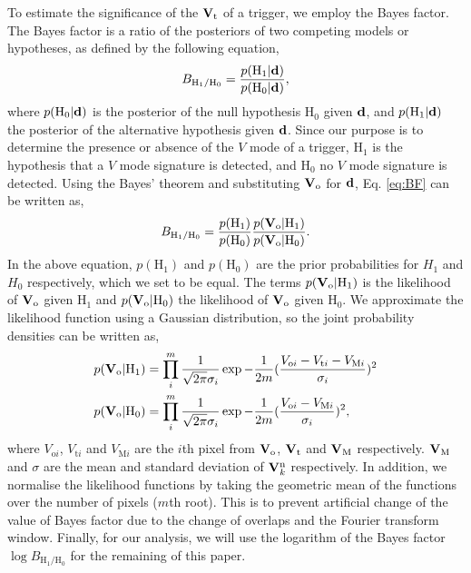\documentclass[aps,twocolumn,showpacs,groupedaddress, nofootinbib]{revtex4}  %
\begin{document}
To estimate the significance of the $\bold{V}_\text{t}$ of a trigger, we employ the Bayes factor.
The Bayes factor is a ratio of the posteriors of two competing models or hypotheses, as defined by the following equation,
\begin{equation}\label{eq:BF}
 B_{\text{H}_1 / \text{H}_0} = \frac{p(\text{H}_1 |\bold{d})}{p(\text{H}_0|\bold{d})},
\end{equation}
where $p(\text{H}_0|\bold{d})$ 
is the posterior of the null hypothesis $\text{H}_0$ given $\bold{d}$, 
and $p(\text{H}_1|\bold{d})$ the posterior of the alternative hypothesis given $\bold{d}$.
Since our purpose is to determine the presence or absence of the $V$ mode of a trigger,
$\text{H}_1$ is the hypothesis that a $V$ mode signature is detected, 
and $\text{H}_0$ no $V$ mode signature is detected.  
Using the Bayes' theorem and substituting $\bold{V}_\text{o}$ for $\bold{d}$, Eq. \ref{eq:BF} can be written as,
\begin{equation}\label{eq:BF2}
 B_{\text{H}_1 / \text{H}_0} = \frac{p(\text{H}_1)}{p(\text{H}_0)}\frac{p(\bold{V}_\text{o}|\text{H}_1)}{p(\bold{V}_\text{o}|\text{H}_0)}.
\end{equation}
In the above equation, $p(\text{H}_1)$ and $p(\text{H}_0)$ are the prior probabilities for $H_1$ and $H_0$ respectively, which we set to be equal.
The terms $p(\bold{V}_\text{o}|\text{H}_1)$ is the likelihood of $\bold{V}_\text{o}$ given $\text{H}_1$ and $p(\bold{V}_\text{o}|\text{H}_0)$ the likelihood of 
$\bold{V}_\text{o}$ given $\text{H}_0$.	
We approximate the likelihood function using a Gaussian distribution,
so the joint probability densities can be written as,
\begin{align}\label{eq:posterior}
 p(\bold{V}_\text{o}|\text{H}_1) &= \prod_{i}^{m} \frac{1}{\sqrt{2\pi} \sigma_i}\exp{-\frac{1}{2m}(\frac{V_{\text{o}i} - V_{\text{t}i} - V_{\text{M}i}}{\sigma_i} )^2} \\ \nonumber
 p(\bold{V}_\text{o}|\text{H}_0) &= \prod_{i}^{m} \frac{1}{\sqrt{2\pi} \sigma_i}\exp{-\frac{1}{2 m}(\frac{V_{\text{o}i}- V_{\text{M}i}}{\sigma_i})^2},
\end{align}
where $V_{\text{o}i}$, $V_{\text{t}i}$ and $V_{\text{M}i}$ are the $i$th pixel from 
$\bold{V}_{\text{o}}$, $\bold{V}_{\text{t}}$ and $\bold{V}_{\text{M}}$ respectively.
$\bold{V}_{\text{M}}$ and $\sigma$ are the mean and standard deviation of $\bold{V}_{k}^{\text{n}}$ respectively. 
In addition, we normalise the likelihood functions by taking the geometric mean of the functions over the number of pixels ($m$th root).
This is to prevent artificial change of the value of Bayes factor due to the change of overlaps and the Fourier transform window.
Finally, for our analysis, we will use the logarithm of the Bayes factor $\log B_{\text{H}_1 / \text{H}_0}$ for the remaining of this paper.
\end{document}
